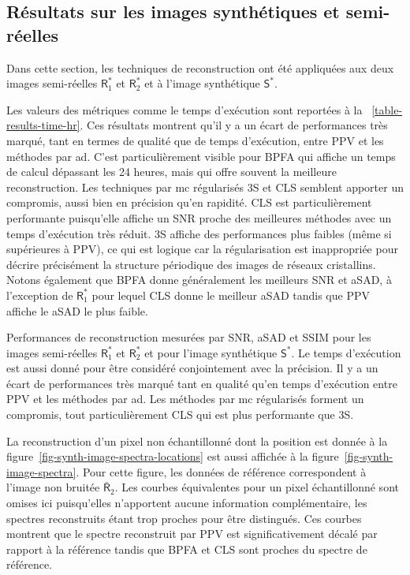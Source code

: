 \subsection{Résultats sur les images synthétiques et semi-réelles}\label{sec-results-hr-synth}

Dans cette section, les techniques de reconstruction ont été appliquées aux deux images semi-réelles $\mathsf{R}_1^*$ et $\mathsf{R}_2^*$ et à l'image synthétique $\mathsf{S}^*$.

Les valeurs des métriques comme le temps d'exécution sont reportées à la \tabname~\ref{table-results-time-hr}. Ces résultats montrent qu'il y a un écart de performances très marqué, tant en termes de qualité que de temps d'exécution, entre PPV et les méthodes par \gls{ad}. C'est particulièrement visible pour BPFA qui affiche un temps de calcul dépassant les 24 heures, mais qui offre souvent la meilleure reconstruction. Les techniques par \gls{mc} régularisés 3S et CLS semblent apporter un compromis, aussi bien en précision qu'en rapidité. CLS est particulièrement performante puisqu'elle affiche un SNR proche des meilleures méthodes avec un temps d'exécution très réduit. 3S affiche des performances plus faibles (même si supérieures à PPV), ce qui est logique car la régularisation est inappropriée pour décrire précisément la structure périodique des images de réseaux cristallins. Notons également que BPFA donne généralement les meilleurs SNR et aSAD, à l'exception de $\mathsf{R}_1^*$ pour lequel CLS donne le meilleur aSAD tandis que PPV affiche le aSAD le plus faible.

\begin{normalfigure*}[htbp]
    \centering
    
    \caption{Performances de reconstruction mesurées par SNR, aSAD et SSIM pour les images semi-réelles $\mathsf{R}_1^*$ et $\mathsf{R}_2^*$ et pour l'image synthétique $\mathsf{S}^*$. Le temps d'exécution est aussi donné pour être considéré conjointement avec la précision. Il y a un écart de performances très marqué tant en qualité qu'en temps d'exécution entre PPV et les méthodes par \gls{ad}. Les méthodes par \gls{mc} régularisés forment un compromis, tout particulièrement CLS qui est plus performante que 3S.
        \protect\label{table-results-time-hr}}
\end{normalfigure*}

La reconstruction d'un pixel non échantillonné dont la position est donnée à la figure~\ref{fig-synth-image-spectra-locations} est aussi affichée à la figure~\ref{fig-synth-image-spectra}. Pour cette figure, les données de référence correspondent à l'image non bruitée $\bar{\mathsf{R}}_2$. Les courbes équivalentes pour un pixel échantillonné sont omises ici puisqu'elles n'apportent aucune information complémentaire, les spectres reconstruits étant trop proches pour être distingués.
%
Ces courbes montrent que le spectre reconstruit par PPV est significativement décalé par rapport à la référence tandis que BPFA et CLS sont proches du spectre de référence. 

